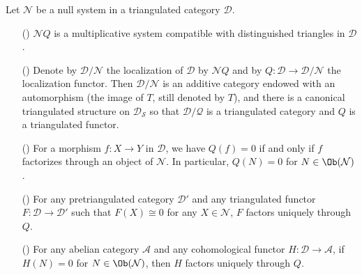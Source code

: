 \begin{theorem}\label{triangle cat null system associated multiplicative system}
Let $\mathcal{N}$ be a null system in a triangulated category $\mathcal{D}$.
\begin{enumerate}
    \item[(\rmnum{1})] $\mathcal{N}Q$ is a multiplicative system compatible with distinguished triangles in $\mathcal{D}$.
    \item[(\rmnum{2})] Denote by $\mathcal{D}/\mathcal{N}$ the localization of $\mathcal{D}$ by $\mathcal{N}Q$ and by $Q:\mathcal{D}\to\mathcal{D}/\mathcal{N}$ the localization functor. Then $\mathcal{D}/\mathcal{N}$ is an additive category endowed with an automorphism (the image of $T$, still denoted by $T$), and there is a canonical triangulated structure on $\mathcal{D}_\mathcal{S}$ so that $\mathcal{D}/\mathcal{Q}$ is a triangulated category and $Q$ is a triangulated functor.
    \item[(\rmnum{3})] For a morphism $f:X\to Y$ in $\mathcal{D}$, we have $Q(f)=0$ if and only if $f$ factorizes through an object of $\mathcal{N}$. In particular, $Q(N)=0$ for $N\in\Ob(\mathcal{N})$.
    \item[(\rmnum{4})] For any pretriangulated category $\mathcal{D}'$ and any triangulated functor $F:\mathcal{D}\to\mathcal{D}'$ such that $F(X)\cong 0$ for any $X\in\mathcal{N}$, $F$ factors uniquely through $Q$.
    \item[(\rmnum{5})] For any abelian category $\mathcal{A}$ and any cohomological functor $H:\mathcal{D}\to\mathcal{A}$, if $H(N)=0$ for $N\in\Ob(\mathcal{N})$, then $H$ factors uniquely through $Q$.
\end{enumerate}
\end{theorem}
